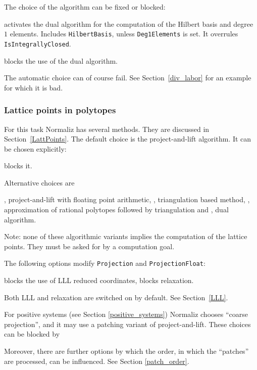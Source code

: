 The choice of the algorithm can be fixed or blocked:
\begin{itemize}
	\itemtt[DualMode, -d] activates the dual algorithm for the computation of the Hilbert basis and degree $1$ elements. Includes \verb|HilbertBasis|, unless \verb|Deg1Elements| is set. It overrules \verb|IsIntegrallyClosed|.
	
	\itemtt[PrimalMode, -P] blocks the use of the dual algorithm.
\end{itemize}

The automatic choice can of course fail. See Section~\ref{div_labor} for an example for which it is bad.

\subsubsection{Lattice points in polytopes}\label{approximate}

For this task Normaliz has several methods. They are discussed in Section~\ref{LattPoints}. The default choice is the project-and-lift algorithm. It can be chosen explicitly:
\begin{itemize}
	\itemtt[Projection, -j]
	
	\itemtt[NoProjection] blocks it.
\end{itemize}

Alternative choices are
\begin{itemize}
	\itemtt[ProjectionFloat, -J], project-and-lift with floating point arithmetic,
	\itemtt[PrimalMode, -P], triangulation based method,
	\itemtt [Approximate, -r], approximation of rational polytopes followed by triangulation and
	\itemtt[DualMode, -d], dual algorithm.
\end{itemize}
Note: none of these algorithmic variants implies the computation of the lattice points. They must be asked for by a computation goal.

The following options modify \verb|Projection| and \verb|ProjectionFloat|:
\begin{itemize}
	\itemtt[NoLLL] blocks the use of LLL reduced coordinates,
	\itemtt[NoRelax] blocks relaxation.
\end{itemize}
Both LLL and relaxation are switched on by default. See Section~\ref{LLL}.

For positive systems (see Section \ref{positive_systems}) Normaliz chooses  ``coarse projection'', and it may use a patching variant of project-and-lift. These choices can be blocked by
\begin{itemize}
	\itemtt[NoCoarseProjection]
	\itemtt[NoPatching]  
\end{itemize}
Moreover, there are further options by which the order, in which the ``patches'' are processed, can be influenced. See Section \ref{patch_order}.

